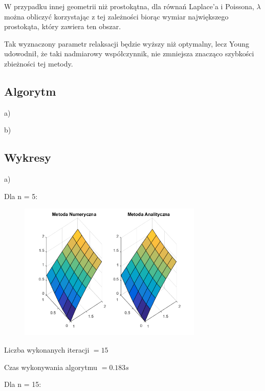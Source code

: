 W przypadku innej geometrii niż prostokątna, dla równań Laplace'a i Poissona, $\lambda$ można obliczyć korzystając z tej zależności biorąc wymiar największego prostokąta, który zawiera ten obszar.

Tak wyznaczony parametr relaksacji będzie wyższy niż optymalny, lecz Young udowodnił, że taki nadmiarowy współczynnik, nie zmniejsza znacząco szybkości zbieżności tej metody.
\newpage
\subsection{Algorytm}

a)


\newpage
b)


\newpage
\subsection{Wykresy}

a)

Dla n = 5:

\begin{figure}[!ht]
	\begin{center}
		\includegraphics[width=0.78\textwidth]{Lab6/charts/young/zad1/5.png}
	\end{center}
\end{figure}

Liczba wykonanych iteracji $ = 15 $

Czas wykonywania algorytmu $ = 0.183 s$

Dla n = 15:

